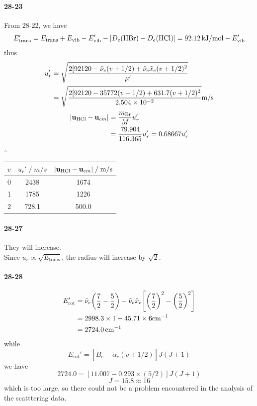 \documentclass[a4paper]{article}
\newcommand{\ex}[1]{\paragraph{28-#1}}
\numberwithin{equation}{section}
\begin{document}
\ex{23}
From 28-22, we have
\begin{equation}\label{key}
E_{\text{trans}}' = E_{\text{trans}} + E_{\text{vib}} - E_{\text{vib}}' - [ D_e(\ce{HBr}) - D_e(\ce{HCl})] = \SI{92.12}{kJ/mol} - E_{\text{vib}}' 
\end{equation}
thus
\begin{align}\label{key}
u_r' &= \sqrt{\dfrac{2[92120 - \tilde{\nu}_e(v+1/2) + \tilde{\nu}_e\tilde{x}_e(v+1/2)^2}{\mu'}} \notag\\
&= \sqrt{\dfrac{2[92120 - 35772(v+1/2) + 631.7(v+1/2)^2}{\num{2.504e-2}}} \si{m/s}
\end{align}
\begin{align}
\abs{\vb{u}_{\ce{HCl}} - \vb{u}_{cm}} &= \dfrac{m_{\ce{Br}}}{M}u_r' \notag\\
&= \dfrac{79.904}{116.365}u_r' = 0.68667u_r' 
\end{align}
$ \therefore $
\begin{table}[H]
	\centering
	\begin{tabular}{ccc}
		\hline
		$ v $ & $ u_r' \;/\; \si{m/s} $ & $ \abs{\vb{u}_{\ce{HCl}} - \vb{u}_{cm}} \;/\; \si{m/s} $ \\ \hline
		0 & 2438 & 1674 \\
		1 & 1785 & 1226 \\
		2 & 728.1 & 500.0\\ \hline
	\end{tabular}
\end{table}


\ex{27}
They will increase.\\
Since $ u_r \propto \sqrt{E_{\text{trans}}} $, the radius will increase by $ \sqrt{2} $.


\ex{28}
\begin{align}
E_{\text{rot}}' &= \tilde{\nu}_e\qty(\dfrac{7}{2}-\dfrac{5}{2}) - \tilde{\nu}_e\tilde{x}_e\qty[\qty(\dfrac{7}{2})^2 - \qty(\dfrac{5}{2})^2] \notag\\
&= 2998.3\times 1 - 45.71\times 6 \si{cm^{-1}}\notag\\
&=  \SI{2724.0}{cm^{-1}}
\end{align}
while
\begin{equation}\label{key}
E_{\text{rot}}' =  [\tilde{B}_e - \tilde\alpha_e(v+1/2)]J(J+1)
\end{equation}
we have
\begin{equation}\label{key}
2724.0 = [11.007 - 0.293\times (5/2)] J(J+1)
\end{equation}
\begin{equation}\label{key}
J = 15.8 \approx 16
\end{equation}
which is too large, so there could not be a problem encountered in the analysis of the scatttering data.
\end{document}
